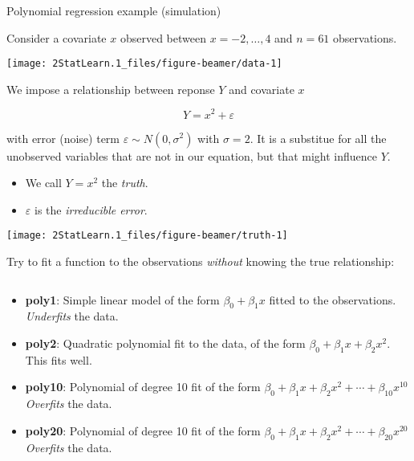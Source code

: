 \documentclass[ignorenonframetext,]{beamer}
\providecommand{\tightlist}{%
  \setlength{\itemsep}{0pt}\setlength{\parskip}{0pt}}
\begin{document}
\begin{frame}

\begin{block}{Polynomial regression example (simulation)}

Consider a covariate \(x\) observed between \(x=-2, \ldots , 4\) and
\(n=61\) observations.

\begin{center}\texttt{[image: 2StatLearn.1\_files/figure-beamer/data-1]} \end{center}

\end{block}

\end{frame}

\begin{frame}

We impose a relationship between reponse \(Y\) and covariate \(x\)

\[ Y=x^2 + \varepsilon\]

with error (noise) term \(\varepsilon\sim N(0,\sigma^2)\) with
\(\sigma=2\). It is a substitue for all the unobserved variables that
are not in our equation, but that might influence \(Y\).

\begin{itemize}
\tightlist
\item
  We call \(Y=x^2\) the \emph{truth}.
\item
  \(\varepsilon\) is the \emph{irreducible error}.
\end{itemize}

\end{frame}

\begin{frame}

\begin{center}\texttt{[image: 2StatLearn.1\_files/figure-beamer/truth-1]} \end{center}

\end{frame}

\begin{frame}

Try to fit a function to the observations \emph{without} knowing the
true relationship:

\(~\)

\begin{itemize}
\item
  \textbf{poly1}: Simple linear model of the form \(\beta_0+\beta_1 x\)
  fitted to the observations. \emph{Underfits} the data.
\item
  \textbf{poly2}: Quadratic polynomial fit to the data, of the form
  \(\beta_0+\beta_1 x +\beta_2 x^2\). This fits well.
\item
  \textbf{poly10}: Polynomial of degree 10 fit of the form
  \(\beta_0+\beta_1 x +\beta_2 x^2+\cdots +\beta_{10}x^{10}\)
  \emph{Overfits} the data.
\item
  \textbf{poly20}: Polynomial of degree 10 fit of the form
  \(\beta_0+\beta_1 x +\beta_2 x^2+\cdots +\beta_{20}x^{20}\)
  \emph{Overfits} the data.
\end{itemize}

\end{frame}
\end{document}
